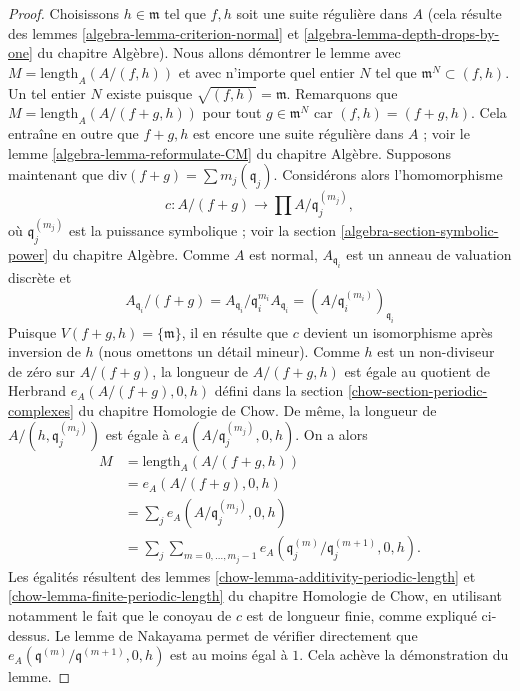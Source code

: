 \begin{proof}
Choisissons $h \in \mathfrak m$ tel que $f, h$ soit une suite régulière dans $A$
(cela résulte des lemmes \ref{algebra-lemma-criterion-normal} et
\ref{algebra-lemma-depth-drops-by-one} du chapitre Algèbre).
Nous allons démontrer le lemme avec $M = \text{length}_A(A/(f, h))$ et avec
n'importe quel entier $N$ tel que $\mathfrak m^N \subset (f, h)$. Un tel
entier $N$ existe puisque $\sqrt{(f, h)} = \mathfrak m$. Remarquons que
$M = \text{length}_A(A/(f + g, h))$ pour tout $g \in \mathfrak m^N$
car $(f, h) = (f + g, h)$. Cela entraîne en outre que $f + g, h$
est encore une suite régulière dans $A$ ; voir le lemme
\ref{algebra-lemma-reformulate-CM} du chapitre Algèbre.
Supposons maintenant que $\text{div}(f + g ) = \sum m_j (\mathfrak q_j)$.
Considérons alors l'homomorphisme
$$
c : A/(f + g) \longrightarrow \prod A/\mathfrak q_j^{(m_j)},
$$
où $\mathfrak q_j^{(m_j)}$ est la puissance symbolique ; voir la section
\ref{algebra-section-symbolic-power} du chapitre Algèbre.
Comme $A$ est normal, $A_{\mathfrak q_i}$ est un anneau de valuation discrète et
$$
A_{\mathfrak q_i}/(f + g) =
A_{\mathfrak q_i}/\mathfrak q_i^{m_i} A_{\mathfrak q_i} =
(A/\mathfrak q_i^{(m_i)})_{\mathfrak q_i}
$$
Puisque $V(f + g, h) = \{\mathfrak m\}$, il en résulte que $c$ devient
un isomorphisme après inversion de $h$ (nous omettons un détail mineur).
Comme $h$ est un non-diviseur de zéro sur $A/(f + g)$, la longueur de
$A/(f + g, h)$ est égale au quotient de Herbrand
$e_A(A/(f + g), 0, h)$ défini dans la section
\ref{chow-section-periodic-complexes} du chapitre Homologie de Chow.
De même, la longueur de $A/(h, \mathfrak q_j^{(m_j)})$ est égale à
$e_A(A/\mathfrak q_j^{(m_j)}, 0, h)$. On a alors
\begin{align*}
M & = \text{length}_A(A/(f + g, h)) \\
& =
e_A(A/(f + g), 0, h) \\
& =
\sum\nolimits_j e_A(A/\mathfrak q_j^{(m_j)}, 0, h) \\
& =
\sum\nolimits_j \sum\nolimits_{m = 0, \ldots, m_j - 1}
e_A(\mathfrak q_j^{(m)}/\mathfrak q_j^{(m + 1)}, 0, h).
\end{align*}
Les égalités résultent des lemmes
\ref{chow-lemma-additivity-periodic-length} et
\ref{chow-lemma-finite-periodic-length} du chapitre Homologie de Chow,
en utilisant notamment le fait que
le conoyau de $c$ est de longueur finie, comme expliqué ci-dessus.
Le lemme de Nakayama permet de vérifier directement que
$e_A(\mathfrak q^{(m)}/\mathfrak q^{(m + 1)}, 0, h)$
est au moins égal à $1$. Cela achève la démonstration du lemme.
\end{proof}

